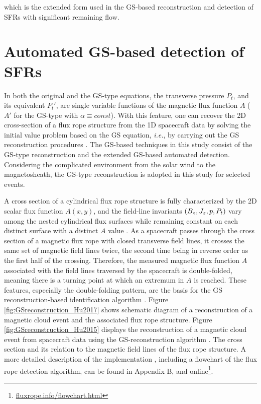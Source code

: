 which is the extended form used in the GS-based reconstruction and detection of SFRs with significant remaining flow.

\section{Automated GS-based detection of SFRs}\label{sec:GS-detection}
In both the original and the GS-type equations, the transverse pressure $P_t$, and its equivalent $P_t'$, are single variable functions of the magnetic flux function $A$ ($A'$ for the GS-type with $\alpha\equiv const$). With this feature, one can recover the 2D cross-section of a flux rope structure from the 1D spacecraft data by solving the initial value problem based on the GS equation, \textit{i.e.}, by carrying out the GS reconstruction procedures \citep{Hau:1999, HuSonnerup:2002, Hu:2017}. The GS-based techniques in this study consist of the GS-type reconstruction and the extended GS-based automated detection. Considering the complicated environment from the solar wind to the magnetosheath, the GS-type reconstruction is adopted in this study for selected events.

A cross section of a cylindrical flux rope structure is fully characterized by the 2D scalar flux function $A(x, y)$, and the field-line invariants $\left( B_z,J_z,p, P_t \right)$ vary among the nested cylindrical flux surfaces while remaining constant on each distinct surface with a distinct $A$ value \citep{Hu:2018}. As a spacecraft passes through the cross section of a magnetic flux rope with closed transverse field lines, it crosses the same set of magnetic field lines twice, the second time being in reverse order as the first half of the crossing. Therefore, the measured magnetic flux function $A$ associated with the field lines traversed by the spacecraft is double-folded, meaning there is a turning point at which an extremum in $A$ is reached. These features, especially the double-folding pattern, are the basis for the GS reconstruction-based identification algorithm \citep{Hu:2018}. Figure \ref{fig:GSreconstruction_Hu2017} shows schematic diagram of a reconstruction of a magnetic cloud event and the associated flux rope structure. Figure \ref{fig:GSreconstruction_Hu2015} displays the reconstruction of a magnetic cloud event from spacecraft data using the GS-reconstruction algorithm \citep{Hu:2015,Hu:2018}. The cross section and its relation to the magnetic field lines of the flux rope structure. A more detailed description of the implementation \citep{Hu:2018}, including a flowchart of the flux rope detection algorithm, can be found in Appendix B, and online\footnote{\url{fluxrope.info/flowchart.html}}. %

